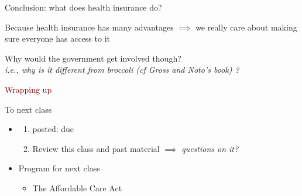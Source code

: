\begin{frame}{Conclusion: what does health insurance do?}
    
Because health insurance has many advantages $\implies$ we really care about making sure everyone has access to it\\
\vspace{7mm}


Why would the government get involved though?\\
\textit{i.e., why is it different from broccoli (cf Gross and Noto's book) ?}\\


\end{frame}
\begin{frame}{}
    \begin{center}
    \Large \textcolor{maroon}{Wrapping up}
    \end{center}
\end{frame}
\begin{frame}{To next class}
\begin{itemize}
    \item {}
    \begin{enumerate}
        \item {} posted: due 
        \item Review this class and past material $\implies$ \textit{questions on it?}
    \end{enumerate}
    \vspace{5mm}

    \item Program for next class
    \begin{itemize}
        \item The Affordable Care Act
    \end{itemize}
\end{itemize}
\end{frame}
